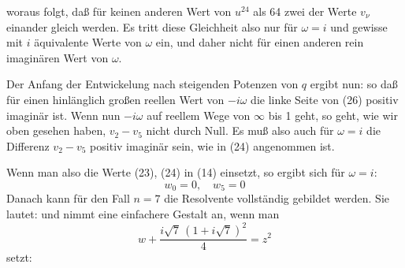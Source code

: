 woraus folgt, daß für keinen anderen Wert von $u^{24}$ als 64 zwei
der Werte $v_\nu$ einander gleich werden. Es tritt diese Gleichheit
also nur für $\omega = i$ und gewisse mit $i$ äquivalente Werte von $\omega$
ein, und daher nicht für einen anderen rein imaginären Wert
von $\omega$.

Der Anfang der Entwickelung nach steigenden Potenzen von
$q$ ergibt nun:
so daß für einen hinlänglich großen reellen Wert von $-i\omega$ die
linke Seite von (26) positiv imaginär ist. Wenn nun $-i\omega$ auf
reellem Wege von $\infty$ bis 1 geht, so geht, wie wir oben gesehen
haben, $v_2 - v_5$ nicht durch Null. Es muß also auch für $\omega = i$
die Differenz $v_2 - v_5$ positiv imaginär sein, wie in (24) angenommen
 ist.

Wenn man also die Werte (23), (24) in (14) einsetzt, so
ergibt sich für $\omega = i$:
\[
w_0 = 0, \quad w_5 = 0
\]
Danach kann für den Fall $n = 7$ die Resolvente vollständig
gebildet werden. Sie lautet:
und nimmt eine einfachere Gestalt an, wenn man
\[
w + \frac{i\sqrt7\,(1+i\sqrt7)^2}{4} = z^2
\]
setzt:
